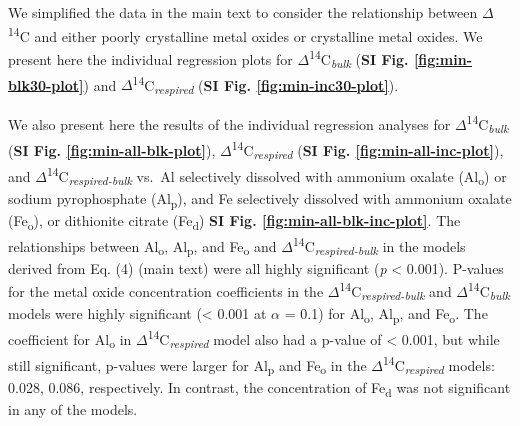 \documentclass[english,man,floatsintext]{apa6}
\begin{document}
We simplified the data in the main text to consider the relationship between \(\Delta\)\textsuperscript{14}C and either poorly crystalline metal oxides or crystalline metal oxides. We present here the individual regression plots for \(\Delta\)\textsuperscript{14}C\textsubscript{\emph{bulk}} (\textbf{SI Fig. \ref{fig:min-blk30-plot}}) and \(\Delta\)\textsuperscript{14}C\textsubscript{\emph{respired}} (\textbf{SI Fig. \ref{fig:min-inc30-plot}}).

We also present here the results of the individual regression analyses for \(\Delta\)\textsuperscript{14}C\textsubscript{\emph{bulk}} (\textbf{SI Fig. \ref{fig:min-all-blk-plot}}), \(\Delta\)\textsuperscript{14}C\textsubscript{\emph{respired}} (\textbf{SI Fig. \ref{fig:min-all-inc-plot}}), and \(\Delta\)\textsuperscript{14}C\textsubscript{\emph{respired-bulk}} vs.~Al selectively dissolved with ammonium oxalate (Al\textsubscript{o}) or sodium pyrophosphate (Al\textsubscript{p}), and Fe selectively dissolved with ammonium oxalate (Fe\textsubscript{o}), or dithionite citrate (Fe\textsubscript{d}) \textbf{SI Fig. \ref{fig:min-all-blk-inc-plot}}. The relationships between Al\textsubscript{o}, Al\textsubscript{p}, and Fe\textsubscript{o} and \(\Delta\)\textsuperscript{14}C\textsubscript{\emph{respired-bulk}} in the models derived from Eq. (4) (main text) were all highly significant (\emph{p} \textless{} 0.001). P-values for the metal oxide concentration coefficients in the \(\Delta\)\textsuperscript{14}C\textsubscript{\emph{respired-bulk}} and \(\Delta\)\textsuperscript{14}C\textsubscript{\emph{bulk}} models were highly significant (\textless{} 0.001 at \(\alpha\) = 0.1) for Al\textsubscript{o}, Al\textsubscript{p}, and Fe\textsubscript{o}. The coefficient for Al\textsubscript{o} in \(\Delta\)\textsuperscript{14}C\textsubscript{\emph{respired}} model also had a p-value of \textless{} 0.001, but while still significant, p-values were larger for Al\textsubscript{p} and Fe\textsubscript{o} in the \(\Delta\)\textsuperscript{14}C\textsubscript{\emph{respired}} models: 0.028, 0.086, respectively.
In contrast, the concentration of Fe\textsubscript{d} was not significant in any of the models.
\end{document}
